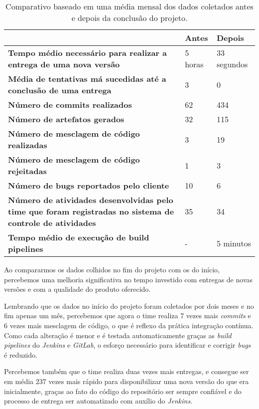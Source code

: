 \documentclass[
	12pt,				%
	openright,			%
	oneside,			%
	a4paper,			%
	english,			%
	french,				%
	spanish,			%
	brazil,				%
	]{abntex2}
\begin{document}
\begin{table}[htb]
	\caption{Comparativo baseado em uma média mensal dos dados coletados antes e depois da conclusão do projeto.}
	
	\label{tab-comparativo}	
	\begin{tabular}{p{7.85cm}|p{3.20cm}|p{3.20cm}}
		& \textbf{Antes} & \textbf{Depois}  \\
		\hline
		\textbf{Tempo médio necessário para realizar a entrega de uma nova versão} & 5 horas & 33 segundos \\
		\hline
		\textbf{Média de tentativas má sucedidas até a conclusão de uma entrega} & 3 & 0 \\
		\hline
		\textbf{Número de commits realizados} & 62 & 434 \\
		\hline
		\textbf{Número de artefatos gerados} & 32 & 115 \\
		\hline
		\textbf{Número de mesclagem de código realizadas} & 3 & 19 \\
		\hline
		\textbf{Número de mesclagem de código rejeitadas} & 1 & 3 \\
		\hline
		\textbf{Número de bugs reportados pelo cliente} & 10 & 6 \\
		\hline
		\textbf{Número de atividades desenvolvidas pelo time que foram registradas no sistema de controle de atividades} & 35 & 34 \\
		\hline
		\textbf{Tempo médio de execução de build pipelines} & - & 5 minutos \\
	\end{tabular}
\end{table}

Ao compararmos os dados colhidos no fim do projeto com os do início, percebemos uma melhoria significativa no tempo investido com entregas de novas versões e com a qualidade do produto oferecido.

Lembrando que os dados no início do projeto foram coletados por dois meses e no fim apenas um mês, percebemos que agora o time realiza 7 vezes mais \textit{commits} e 6 vezes mais mesclagem de código, o que é reflexo da prática integração contínua. Como cada alteração é menor e é testada automaticamente graças as \textit{build pipelines} do \textit{Jenkins} e \textit{GitLab}, o esforço necessário para identificar e corrigir \textit{bugs} é reduzido.

Percebemos também que o time realiza duas vezes mais entregas, e consegue ser em média 237 vezes mais rápido para disponibilizar uma nova versão do que era inicialmente, graças ao fato do código do repositório ser sempre confiável e do processo de entrega ser automatizado com auxílio do \textit{Jenkins}.
\end{document}
